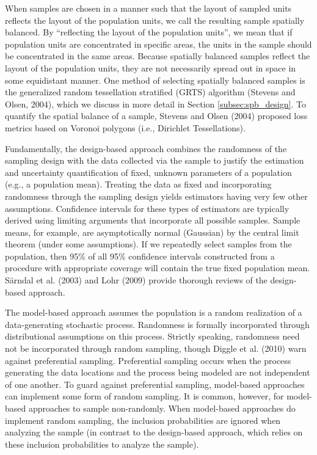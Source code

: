 \documentclass[]{elsarticle} %
\begin{document}
When samples are chosen in a manner such that the layout of sampled
units reflects the layout of the population units, we call the resulting
sample spatially balanced. By ``reflecting the layout of the population
units'', we mean that if population units are concentrated in specific
areas, the units in the sample should be concentrated in the same areas.
Because spatially balanced samples reflect the layout of the population
units, they are not necessarily spread out in space in some equidistant
manner. One method of selecting spatially balanced samples is the
generalized random tessellation stratified (GRTS) algorithm (Stevens and
Olsen, 2004), which we discuss in more detail in Section
\ref{subsec:spb_design}. To quantify the spatial balance of a sample,
Stevens and Olsen (2004) proposed loss metrics based on Voronoi polygons
(i.e., Dirichlet Tessellations).

Fundamentally, the design-based approach combines the randomness of the
sampling design with the data collected via the sample to justify the
estimation and uncertainty quantification of fixed, unknown parameters
of a population (e.g., a population mean). Treating the data as fixed
and incorporating randomness through the sampling design yields
estimators having very few other assumptions. Confidence intervals for
these types of estimators are typically derived using limiting arguments
that incorporate all possible samples. Sample means, for example, are
asymptotically normal (Gaussian) by the central limit theorem (under
some assumptions). If we repeatedly select samples from the population,
then 95\% of all 95\% confidence intervals constructed from a procedure
with appropriate coverage will contain the true fixed population mean.
Särndal et al. (2003) and Lohr (2009) provide thorough reviews of the
design-based approach.

The model-based approach assumes the population is a random realization
of a data-generating stochastic process. Randomness is formally
incorporated through distributional assumptions on this process.
Strictly speaking, randomness need not be incorporated through random
sampling, though Diggle et al. (2010) warn against preferential
sampling. Preferential sampling occurs when the process generating the
data locations and the process being modeled are not independent of one
another. To guard against preferential sampling, model-based approaches
can implement some form of random sampling. It is common, however, for
model-based approaches to sample non-randomly. When model-based
approaches do implement random sampling, the inclusion probabilities are
ignored when analyzing the sample (in contrast to the design-based
approach, which relies on these inclusion probabilities to analyze the
sample).
\end{document}
